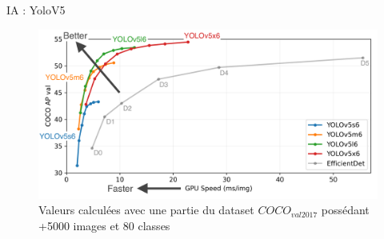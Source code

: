         \begin{frame}[allowframebreaks]{IA : YoloV5}
            
            \begin{figure}[H]
                \centering
                \includegraphics[width=0.9\linewidth]{images/modeleSpeedYolo.png}
                \caption*{Valeurs calculées avec une partie du dataset $COCO_{val2017}$ possédant +5000 images et 80 classes}
            \end{figure}
            

\end{frame}
